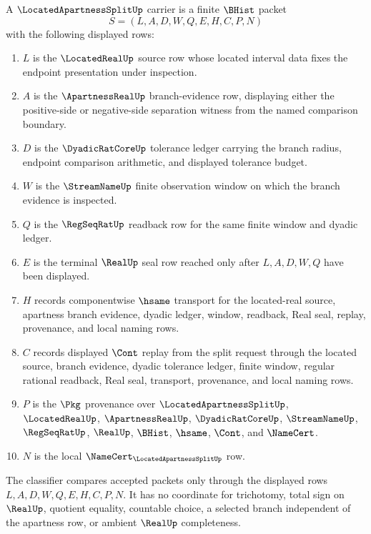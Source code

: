 \begin{definition}
\label{def:located-apartness-split-carrier}
A $\LocatedApartnessSplitUp$ carrier is a finite $\BHist$ packet
$$
S=(L,A,D,W,Q,E,H,C,P,N)
$$
with the following displayed rows:
\begin{enumerate}
\item $L$ is the $\LocatedRealUp$ source row whose located interval data fixes the endpoint presentation under inspection.
\item $A$ is the $\ApartnessRealUp$ branch-evidence row, displaying either the positive-side or negative-side separation witness from the named comparison boundary.
\item $D$ is the $\DyadicRatCoreUp$ tolerance ledger carrying the branch radius, endpoint comparison arithmetic, and displayed tolerance budget.
\item $W$ is the $\StreamNameUp$ finite observation window on which the branch evidence is inspected.
\item $Q$ is the $\RegSeqRatUp$ readback row for the same finite window and dyadic ledger.
\item $E$ is the terminal $\RealUp$ seal row reached only after $L,A,D,W,Q$ have been displayed.
\item $H$ records componentwise $\hsame$ transport for the located-real source, apartness branch evidence, dyadic ledger, window, readback, Real seal, replay, provenance, and local naming rows.
\item $C$ records displayed $\Cont$ replay from the split request through the located source, branch evidence, dyadic tolerance ledger, finite window, regular rational readback, Real seal, transport, provenance, and local naming rows.
\item $P$ is the $\Pkg$ provenance over $\LocatedApartnessSplitUp$, $\LocatedRealUp$, $\ApartnessRealUp$, $\DyadicRatCoreUp$, $\StreamNameUp$, $\RegSeqRatUp$, $\RealUp$, $\BHist$, $\hsame$, $\Cont$, and $\NameCert$.
\item $N$ is the local $\NameCert_{\LocatedApartnessSplitUp}$ row.
\end{enumerate}
The classifier compares accepted packets only through the displayed rows $L,A,D,W,Q,E,H,C,P,N$. It has no coordinate for trichotomy, total sign on $\RealUp$, quotient equality, countable choice, a selected branch independent of the apartness row, or ambient $\RealUp$ completeness.
\end{definition}

